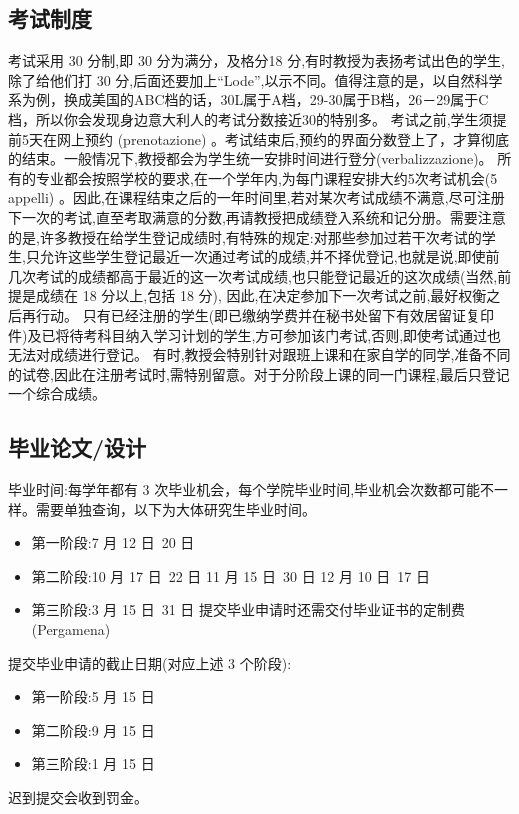 \subsection{考试制度}
考试采用 30 分制,即 30 分为满分，及格分18 分,有时教授为表扬考试出色的学生,除了给他们打 30 分,后面还要加上“Lode”,以示不同。值得注意的是，以自然科学系为例，换成美国的ABC档的话，30L属于A档，29-30属于B档，26－29属于C档，所以你会发现身边意大利人的考试分数接近30的特别多。
考试之前,学生须提前5天在网上预约 (prenotazione) 。考试结束后,预约的界面分数登上了，才算彻底的结束。一般情况下,教授都会为学生统一安排时间进行登分(verbalizzazione)。
所有的专业都会按照学校的要求,在一个学年内,为每门课程安排大约5次考试机会(5 appelli) 。因此,在课程结束之后的一年时间里,若对某次考试成绩不满意,尽可注册下一次的考试,直至考取满意的分数,再请教授把成绩登入系统和记分册。需要注意的是,许多教授在给学生登记成绩时,有特殊的规定:对那些参加过若干次考试的学生,只允许这些学生登记最近一次通过考试的成绩,并不择优登记,也就是说,即使前几次考试的成绩都高于最近的这一次考试成绩,也只能登记最近的这次成绩(当然,前提是成绩在 18 分以上,包括 18 分), 因此,在决定参加下一次考试之前,最好权衡之后再行动。 只有已经注册的学生(即已缴纳学费并在秘书处留下有效居留证复印件)及已将待考科目纳入学习计划的学生,方可参加该门考试,否则,即使考试通过也无法对成绩进行登记。 
有时,教授会特别针对跟班上课和在家自学的同学,准备不同的试卷,因此在注册考试时,需特别留意。对于分阶段上课的同一门课程,最后只登记一个综合成绩。

\subsection{毕业论文/设计}

毕业时间:每学年都有 3 次毕业机会，每个学院毕业时间,毕业机会次数都可能不一样。需要单独查询，以下为大体研究生毕业时间。
\begin{itemize}
\item 第一阶段:7 月 12 日~20 日
\item 第二阶段:10 月 17 日~22 日 11 月 15 日~30 日 12 月 10 日~17 日
\item 第三阶段:3 月 15 日~31 日
提交毕业申请时还需交付毕业证书的定制费 (Pergamena) 
\end{itemize}

\noindent 提交毕业申请的截止日期(对应上述 3 个阶段): 
\begin{itemize}
\item 第一阶段:5 月 15 日
\item 第二阶段:9 月 15 日
\item 第三阶段:1 月 15 日 
\end{itemize}
迟到提交会收到罚金。

